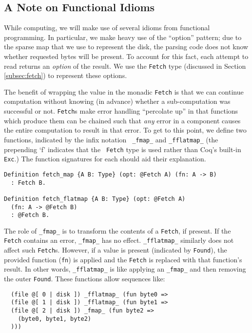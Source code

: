 \documentclass[nocopyrightspace,preprint]{sigplanconf}
\begin{document}
\subsection{A Note on Functional Idioms}
\label{subsec:functionalext2}

While computing, we will make use of several idioms from functional
programming.  In particular, we make heavy use of the ``option'' pattern; due
to the sparse map that we use to represent the disk, the parsing code does not
know whether requested bytes will be present. To account for this fact, each
attempt to read returns an {\em option} of the result. We use the {\tt Fetch}
type (discussed in Section \ref{subsec:fetch}) to represent these options.

The benefit of wrapping the value in the monadic {\tt Fetch} is that we can
continue computation without knowing (in advance) whether a sub-computation
was successful or not. {\tt Fetch}s make error handling ``percolate up'' in
that functions which produce them can be chained such that {\em any} error in
a component causes the entire computation to result in that error. To get to
this point, we define two functions, indicated by the infix notation {\tt
\_fmap\_} and {\tt \_fflatmap\_} (the prepending `f' indicates that the {\tt
Fetch} type is used rather than Coq's built-in {\tt Exc}.) The function
signatures for each should aid their explanation.

\begin{lstlisting}
Definition fetch_map {A B: Type} (opt: @Fetch A) (fn: A -> B)
  : Fetch B.

Definition fetch_flatmap {A B: Type} (opt: @Fetch A) 
  (fn: A -> @Fetch B)
  : @Fetch B.
\end{lstlisting}

The role of {\tt \_fmap\_} is to transform the contents of a {\tt Fetch}, if
present. If the {\tt Fetch} contains an error, {\tt \_fmap\_} has no effect.
{\tt \_fflatmap\_} similarly does not affect such {\tt Fetch}s. However, if a
value is present (indicated by {\tt Found}), the provided function ({\tt fn})
is applied and the {\tt Fetch} is replaced with that function's result. In
other words, {\tt \_fflatmap\_} is like applying an {\tt \_fmap\_} and then
removing the outer {\tt Found}. These functions allow sequences like:

\begin{lstlisting}
  (file @[ 0 | disk ]) _fflatmap_ (fun byte0 =>
  (file @[ 1 | disk ]) _fflatmap_ (fun byte1 =>
  (file @[ 2 | disk ]) _fmap_ (fun byte2 =>
    (byte0, byte1, byte2)
  )))
\end{lstlisting}
\end{document}
